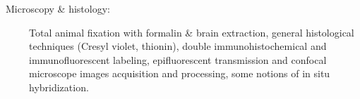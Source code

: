 \documentclass[a4paper,12pt,oneside]{letter}
\begin{document}
{\begin{description}
\item [\textbullet~Microscopy \& histology:] Total animal fixation with formalin \& brain extraction, general histological techniques (Cresyl violet, thionin), double immunohistochemical and immunofluorescent labeling, epifluorescent transmission and confocal microscope images acquisition and processing, some notions of in situ hybridization.

\end{description}
% 
% 
% 
}%
\end{document}
